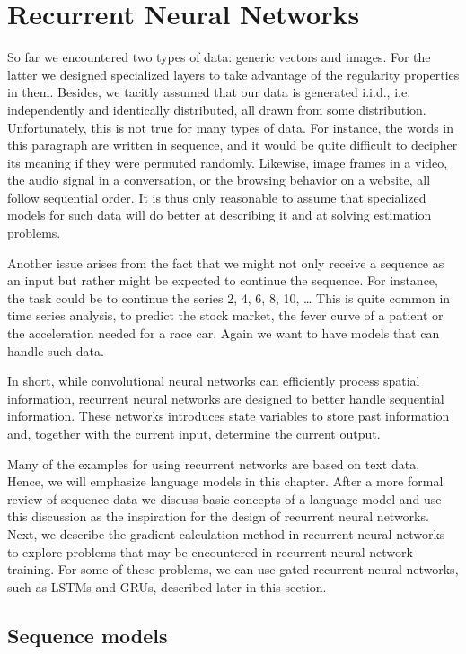 \section{Recurrent Neural Networks}\label{sec:rnn}

So far we encountered two types of data: generic vectors and images. For the latter we designed specialized layers to take advantage of the regularity properties in them. Besides, we tacitly assumed that our data is generated i.i.d., i.e. independently and identically distributed, all drawn from some distribution. Unfortunately, this is not true for many types of data. For instance, the words in this paragraph are written in sequence, and it would be quite difficult to decipher its meaning if they were permuted randomly. Likewise, image frames in a video, the audio signal in a conversation, or the browsing behavior on a website, all follow sequential order. It is thus only reasonable to assume that specialized models for such data will do better at describing it and at solving estimation problems.

Another issue arises from the fact that we might not only receive a sequence as an input but rather might be expected to continue the sequence. For instance, the task could be to continue the series 2, 4, 6, 8, 10, … This is quite common in time series analysis, to predict the stock market, the fever curve of a patient or the acceleration needed for a race car. Again we want to have models that can handle such data.

In short, while convolutional neural networks can efficiently process spatial information, recurrent neural networks are designed to better handle sequential information. These networks introduces state variables to store past information and, together with the current input, determine the current output.

Many of the examples for using recurrent networks are based on text data. Hence, we will emphasize language models in this chapter. After a more formal review of sequence data we discuss basic concepts of a language model and use this discussion as the inspiration for the design of recurrent neural networks. Next, we describe the gradient calculation method in recurrent neural networks to explore problems that may be encountered in recurrent neural network training. For some of these problems, we can use gated recurrent neural networks, such as LSTMs and GRUs, described later in this section.

\subsection{Sequence models}\label{subsec:sequence_models}


